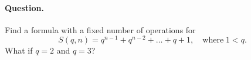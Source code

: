 \paragraph{Question.} Find a formula with a fixed number of
  operations for \[S(q,n) = q^{n-1} + q^{n-2} + \dots + q + 1, \quad
  \text{where} \; 1 < q.\] What if \(q=2\) and \(q=3\)?
